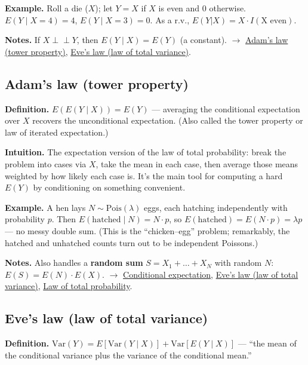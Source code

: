 \documentclass[11pt,a4paper]{article}
\begin{document}
\textbf{Example.} Roll a die ($X$); let $Y = X$ if $X$ is even and $0$ otherwise. $E(Y \mid X = 4) = 4$, $E(Y \mid X = 3) = 0$. As a r.v., $E(Y|X) = X\cdot I(\text{X even})$.

\textbf{Notes.} If $X \perp\!\!\!\perp  Y$, then $E(Y \mid X) = E(Y)$ (a constant). $\to$ \hyperref[sec:adams-law-tower-property]{Adam's law (tower property)}, \hyperref[sec:eves-law-law-of-total-variance]{Eve's law (law of total variance)}.

\subsection{Adam's law (tower property)}\label{sec:adams-law-tower-property}

\textbf{Definition.} $E(E(Y \mid X)) = E(Y)$ --- averaging the conditional expectation over $X$ recovers the unconditional expectation. (Also called the tower property or law of iterated expectation.)

\textbf{Intuition.} The expectation version of the law of total probability: break the problem into cases via $X$, take the mean in each case, then average those means weighted by how likely each case is. It's the main tool for computing a hard $E(Y)$ by conditioning on something convenient.

\textbf{Example.} A hen lays $N \sim \mathrm{Pois}(\lambda )$ eggs, each hatching independently with probability $p$. Then $E(\text{hatched} \mid N) = N\cdot p$, so $E(\text{hatched}) = E(N\cdot p) = \lambda p$ --- no messy double sum. (This is the ``chicken--egg'' problem; remarkably, the hatched and unhatched counts turn out to be independent Poissons.)

\textbf{Notes.} Also handles a \textbf{random sum} $S = X_{1} + \ldots  + X_N$ with random $N$: $E(S) = E(N)\cdot E(X)$. $\to$ \hyperref[sec:conditional-expectation]{Conditional expectation}, \hyperref[sec:eves-law-law-of-total-variance]{Eve's law (law of total variance)}, \hyperref[sec:law-of-total-probability]{Law of total probability}.

\subsection{Eve's law (law of total variance)}\label{sec:eves-law-law-of-total-variance}

\textbf{Definition.} $\mathrm{Var}(Y) = E[\mathrm{Var}(Y \mid X)] + \mathrm{Var}[E(Y \mid X)]$ --- ``the mean of the conditional variance plus the variance of the conditional mean.''
\end{document}
